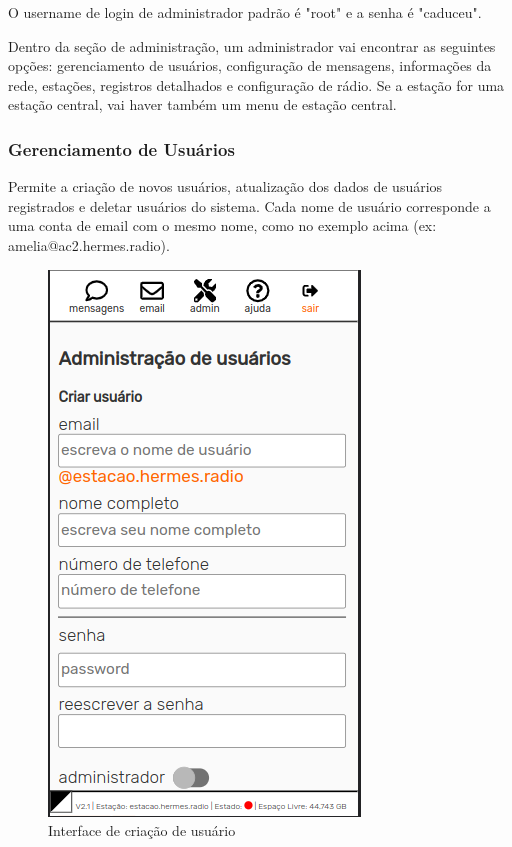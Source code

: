 \documentclass[11pt,a4paper]{article}
\begin{document}

O username de login de administrador padrão é "root" e a senha é "caduceu".


Dentro da seção de administração, um administrador vai encontrar as seguintes opções: gerenciamento de usuários, configuração de mensagens, informações da rede, estações, registros detalhados e configuração de rádio. Se a estação for uma estação central, vai haver também um menu de estação central.

\subsubsection{Gerenciamento de Usuários} 

Permite a criação de novos usuários, atualização dos dados de usuários registrados e deletar usuários do sistema. Cada nome de usuário corresponde a uma conta de email com o mesmo nome, como no exemplo acima (ex: amelia@ac2.hermes.radio).
    
    \begin{figure}[H]
    \centering
    \includegraphics[width=0.5\columnwidth]{screenshots/frontend/pt_kn/createuser.png}
    \caption{Interface de criação de usuário}
    \label{fig:createuser}
    \end{figure}
    
\end{document}
